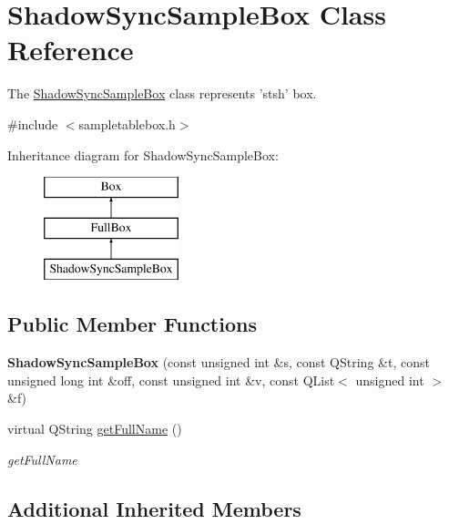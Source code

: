 \hypertarget{class_shadow_sync_sample_box}{\section{Shadow\-Sync\-Sample\-Box Class Reference}
\label{class_shadow_sync_sample_box}
}


The \hyperlink{class_shadow_sync_sample_box}{Shadow\-Sync\-Sample\-Box} class represents 'stsh' box.  




{\ttfamily \#include $<$sampletablebox.\-h$>$}

Inheritance diagram for Shadow\-Sync\-Sample\-Box\-:\begin{figure}[H]
\begin{center}
\leavevmode
\includegraphics[height=3.000000cm]{class_shadow_sync_sample_box}
\end{center}
\end{figure}
\subsection*{Public Member Functions}
\begin{DoxyCompactItemize}
\item 
\hypertarget{class_shadow_sync_sample_box_a89922f916010bfcfb27dc43587e9c1d1}{{\bfseries Shadow\-Sync\-Sample\-Box} (const unsigned int \&s, const Q\-String \&t, const unsigned long int \&off, const unsigned int \&v, const Q\-List$<$ unsigned int $>$ \&f)}\label{class_shadow_sync_sample_box_a89922f916010bfcfb27dc43587e9c1d1}

\item 
virtual Q\-String \hyperlink{class_shadow_sync_sample_box_ab6644ef80649f21ac098f0d78904e9df}{get\-Full\-Name} ()
\begin{DoxyCompactList}\small\item\em get\-Full\-Name \end{DoxyCompactList}\end{DoxyCompactItemize}
\subsection*{Additional Inherited Members}



